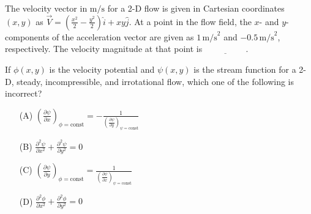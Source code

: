     \item The velocity vector in $\text{m/s}$ for a 2-D flow is given in Cartesian coordinates $(x, y)$ as $\vec{V} = \left( \frac{x^2}{2} - \frac{y^2}{2} \right) \hat{i} + xy \hat{j}$. At a point in the flow field, the $x$- and $y$-components of the acceleration vector are given as $1 \, \text{m/s}^2$ and $-0.5 \, \text{m/s}^2$, respectively. The velocity magnitude at that point is $\underline{\hspace{2cm}}$.
\item  If $\phi(x, y)$ is the velocity potential and $\psi(x, y)$ is the stream function for a 2-D, steady, incompressible, and irrotational flow, which one of the following is incorrect?
\begin{enumerate}
    \item[(A)] $\left( \frac{\partial \psi}{\partial x} \right)_{\phi= \text{const}}  = -\frac{1}{\left( \frac{\partial \psi}{\partial y} \right)_{\psi= \text{const}}}$
    \item[(B)] $\frac{\partial^2 \psi}{\partial x^2} + \frac{\partial^2 \psi}{\partial y^2} = 0$
    \item[(C)] $\left( \frac{\partial \psi}{\partial y} \right)_{\phi= \text{const}} =  \frac{1}{\left( \frac{\partial \psi}{\partial x} \right)_{\psi= \text{const}}}$
    \item[(D)] $\frac{\partial^2 \phi}{\partial x^2} + \frac{\partial^2 \phi}{\partial y^2} = 0$
\end{enumerate}




